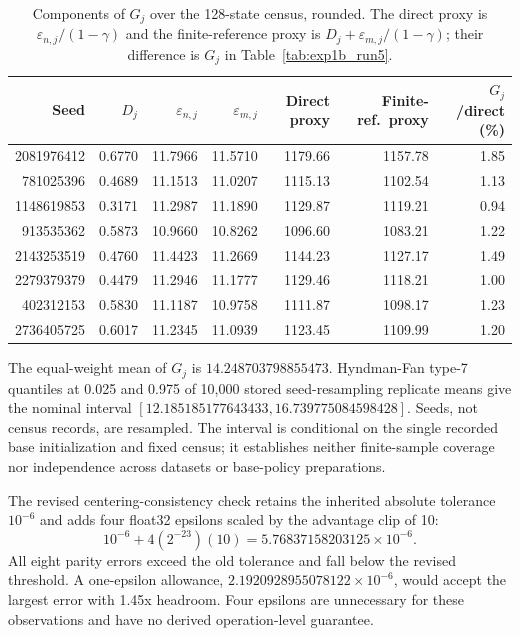 \documentclass{article}
\theoremstyle{plain}
\theoremstyle{definition}
\theoremstyle{remark}
\begin{document}
\begin{table}[htbp]
\caption{Components of $G_j$ over the 128-state census, rounded. The direct
proxy is $\varepsilon_{n,j}/(1-\gamma)$ and the finite-reference proxy is
$D_j+\varepsilon_{m,j}/(1-\gamma)$; their difference is $G_j$ in
Table~\ref{tab:exp1b_run5}.}
\label{tab:exp1b_levels}
\centering
\small
\setlength{\tabcolsep}{4pt}
\begin{tabular}{@{}rrrrrrr@{}}
\toprule
Seed & $D_j$ & $\varepsilon_{n,j}$ & $\varepsilon_{m,j}$ & Direct proxy
& Finite-ref.\ proxy & $G_j$/direct (\%) \\
\midrule
2081976412 & 0.6770 & 11.7966 & 11.5710 & 1179.66 & 1157.78 & 1.85 \\
781025396  & 0.4689 & 11.1513 & 11.0207 & 1115.13 & 1102.54 & 1.13 \\
1148619853 & 0.3171 & 11.2987 & 11.1890 & 1129.87 & 1119.21 & 0.94 \\
913535362  & 0.5873 & 10.9660 & 10.8262 & 1096.60 & 1083.21 & 1.22 \\
2143253519 & 0.4760 & 11.4423 & 11.2669 & 1144.23 & 1127.17 & 1.49 \\
2279379379 & 0.4479 & 11.2946 & 11.1777 & 1129.46 & 1118.21 & 1.00 \\
402312153  & 0.5830 & 11.1187 & 10.9758 & 1111.87 & 1098.17 & 1.23 \\
2736405725 & 0.6017 & 11.2345 & 11.0939 & 1123.45 & 1109.99 & 1.20 \\
\bottomrule
\end{tabular}
\end{table}

The equal-weight mean of $G_j$ is $14.248703798855473$. Hyndman-Fan type-7
quantiles at 0.025 and 0.975 of 10,000 stored seed-resampling replicate means
give the nominal interval $[12.185185177643433,16.739775084598428]$.
Seeds, not census records, are resampled. The interval is conditional on the
single recorded base initialization and fixed census; it establishes neither
finite-sample coverage nor independence across datasets or base-policy preparations.

The revised centering-consistency check retains the inherited absolute tolerance $10^{-6}$
and adds four float32 epsilons scaled by the advantage clip of 10:
\[
10^{-6}+4(2^{-23})(10)=5.76837158203125\times10^{-6}.
\]
All eight parity errors exceed the old tolerance and fall below the revised
threshold. A one-epsilon allowance, $2.1920928955078122\times10^{-6}$,
would accept the largest error with 1.45x headroom. Four epsilons are
unnecessary for these observations and have no derived operation-level guarantee.
\end{document}
